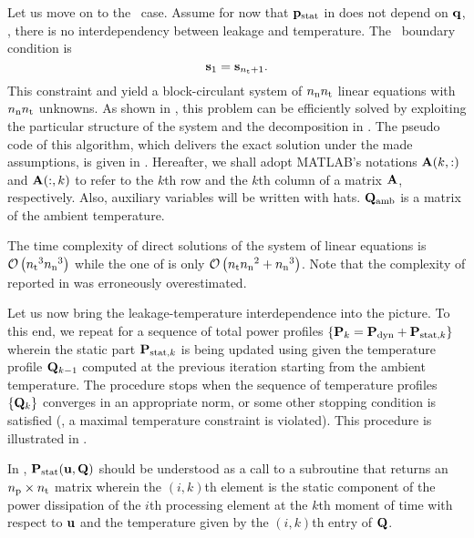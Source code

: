 Let us move on to the \dss\ case.
Assume for now that $\mathbf{p}_{\text{stat}}$ in  does not depend on $\mathbf{q}$, \ie, there is no interdependency between leakage and temperature.
The \dss\ boundary condition is
\[
  \mathbf{s}_1 = \mathbf{s}_{{n_\text{t}} + 1}.
\]
This constraint and  yield a block-circulant system of ${n_\text{n}} {n_\text{t}}$ linear equations with ${n_\text{n}} {n_\text{t}}$ unknowns.
As shown in \cite{ukhov2012}, this problem can be efficiently solved by exploiting the particular structure of the system and the decomposition in .
The pseudo code of this algorithm, which delivers the exact solution under the made assumptions, is given in .
Hereafter, we shall adopt MATLAB's notations $\mathbf{A}(k, :)$ and $\mathbf{A}(:, k)$ to refer to the $k$th row and the $k$th column of a matrix $\mathbf{A}$, respectively.
Also, auxiliary variables will be written with hats.
$\mathbf{Q}_{\text{amb}}$ is a matrix of the ambient temperature.
\begin{remark}
The time complexity of direct solutions of the system of linear equations is $\mathcal{O}\left( {n_\text{t}}^3 {n_\text{n}}^3 \right)$ while the one of  is only $\mathcal{O}\left( {n_\text{t}} {n_\text{n}}^2 + {n_\text{n}}^3 \right)$.
Note that the complexity of  reported in \cite{ukhov2012} was erroneously overestimated.
\end{remark}


Let us now bring the leakage-temperature interdependence into the picture.
To this end, we repeat  for a sequence of total power profiles $\{ \mathbf{P}_k = \mathbf{P}_{\text{dyn}} + \mathbf{P}_{\text{stat}, k} \}$ wherein the static part $\mathbf{P}_{\text{stat}, k}$ is being updated using  given the temperature profile $\mathbf{Q}_{k - 1}$ computed at the previous iteration starting from the ambient temperature.
The procedure stops when the sequence of temperature profiles $\{ \mathbf{Q}_k \}$ converges in an appropriate norm, or some other stopping condition is satisfied (\eg, a maximal temperature constraint is violated).
This procedure is illustrated in .


In , $\mathbf{P}_{\text{stat}}(\mathbf{u}, \mathbf{Q})$ should be understood as a call to a subroutine that returns an ${n_\text{p}} \times {n_\text{t}}$ matrix wherein the $(i, k)$th element is the static component of the power dissipation of the $i$th processing element at the $k$th moment of time with respect to $\mathbf{u}$ and the temperature given by the $(i, k)$th entry of $\mathbf{Q}$.

